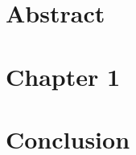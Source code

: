 \documentclass{report}
\begin{document}


\chapter*{Abstract}


\tableofcontents

\chapter{Chapter 1}


\chapter*{Conclusion}

\end{document}
